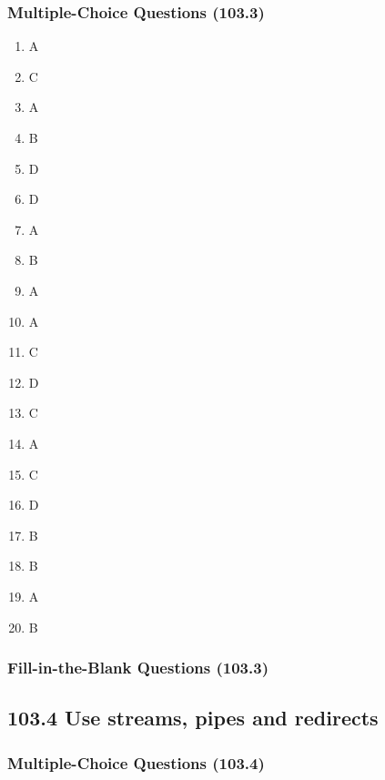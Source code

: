 \documentclass[a4paper]{report}
\begin{document}
\subsubsection*{Multiple-Choice Questions (103.3)}

\begin{enumerate}[1.]
    \item A
    \item C
    \item A
    \item B
    \item D
    \item D
    \item A
    \item B
    \item A
    \item A
    \item C
    \item D
    \item C
    \item A
    \item C
    \item D
    \item B
    \item B
    \item A
    \item B
\end{enumerate}

\subsubsection*{Fill-in-the-Blank Questions (103.3)}


\subsection*{103.4 Use streams, pipes and redirects}
\subsubsection*{Multiple-Choice Questions (103.4)}
\end{document}
